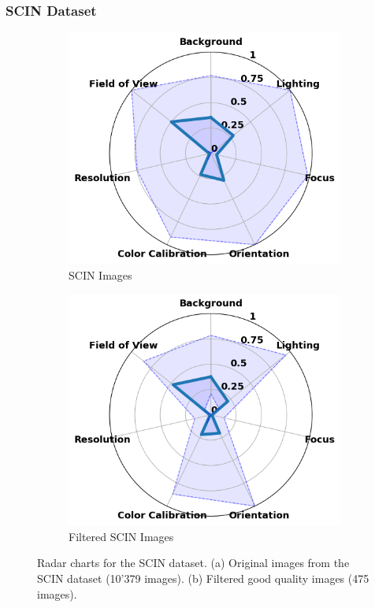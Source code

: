 \subsubsection{SCIN Dataset}
\label{subsubsec:SCINDataset}
\begin{figure}[ht]
    \centering
    \begin{subfigure}[b]{0.48\textwidth}
        \includegraphics[width=\textwidth]{img/hept/SCIN10k.png}
        \caption{SCIN Images}
        \label{fig:SCIN10k}
    \end{subfigure}
    \hfill
    \begin{subfigure}[b]{0.48\textwidth}
        \includegraphics[width=\textwidth]{img/hept/SCIN.png}
        \caption{Filtered SCIN Images}
        \label{fig:SCIN}
    \end{subfigure}
    \hfill
    \caption{Radar charts for the SCIN dataset. (a) Original images from the SCIN dataset (10'379 images). (b) Filtered good quality images (475 images).}
    \label{fig:SF}
\end{figure}
\clearpage
